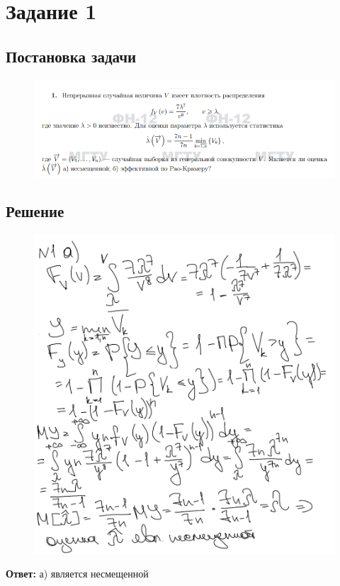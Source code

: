 \newpage
\section*{Задание 1}
\large
\subsection*{Постановка задачи}
\begin{figure}[h!]
	\center \includegraphics[scale=0.6]{img/us.png}
\end{figure}
\subsection*{Решение}
\begin{figure}[h!]
	\center \includegraphics[scale=0.5]{img/resh.png}
\end{figure}
\textbf{Ответ:} а) является несмещенной
